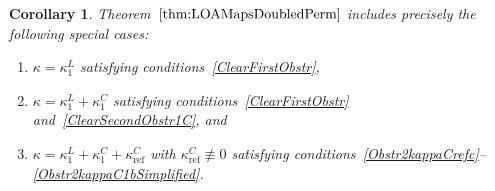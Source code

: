 \documentclass[10pt,a4paper]{amsart}
\numberwithin{equation}{section}
\newtheorem{Corollary}[Theorem]{Corollary}
\DeclareMathOperator{\refl}{ref}
\begin{document}
\begin{Corollary}\label{SpecialCases}
Theorem~$\ref{thm:LOAMapsDoubledPerm}$ includes precisely the following special cases:
\begin{enumerate}[label=$(\arabic*)$]\itemsep=0pt
\item $\kappa=\kappa^L_1$ satisfying conditions~\eqref{ClearFirstObstr},
\item $\kappa=\kappa^L_1+\kappa^C_1$ satisfying conditions~\eqref{ClearFirstObstr} and~\eqref{ClearSecondObstr1C}, and
\item $\kappa=\kappa^L_1+\kappa^C_1+\kappa^C_{\refl}$ with $\kappa^C_{\refl}\not\equiv 0$
satisfying conditions~\eqref{Obstr2kappaCrefc}--\eqref{Obstr2kappaC1bSimplified}.
\end{enumerate}
\end{Corollary}
\end{document}
